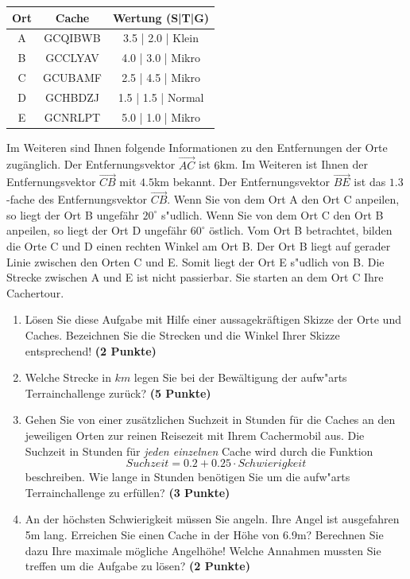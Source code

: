 \documentclass[a4paper, 9pt]{scrartcl}\usepackage[]{graphicx}\usepackage[]{xcolor}
\begin{document}
\begin{center}
  \begin{tabular}{ ccc }
    \toprule
    Ort & Cache & Wertung (S|T|G) \\
    \midrule
    A & GCQIBWB & 3.5 | 2.0 | Klein \\
    B & GCCLYAV & 4.0 | 3.0 | Mikro \\ 
    C & GCUBAMF & 2.5 | 4.5 | Mikro \\ 
    D & GCHBDZJ & 1.5 | 1.5 | Normal \\ 
    E & GCNRLPT & 5.0 | 1.0 | Mikro \\     
 \bottomrule
\end{tabular}
\end{center}

Im Weiteren sind Ihnen folgende Informationen zu den Entfernungen der Orte
zug{\"a}nglich. Der Entfernungsvektor $\overrightarrow{AC}$ ist
$6$km. Im Weiteren ist Ihnen der Entfernungsvektor
$\overrightarrow{CB}$ mit $4.5$km bekannt. Der
Entfernungsvektor $\overrightarrow{BE}$ ist das $1.3$-fache
des Entfernungsvektor $\overrightarrow{CB}$. Wenn Sie von dem Ort A den Ort
C anpeilen, so liegt der Ort B ungef{\"a}hr $20^\circ$
s{"u}dlich. Wenn Sie von dem Ort C den Ort B anpeilen, so liegt
der Ort D ungef{\"a}hr $60^\circ$ {\"o}stlich. Vom Ort B
betrachtet, bilden die Orte C und D einen rechten Winkel am Ort B. Der Ort
B liegt auf gerader Linie zwischen den Orten C und E. Somit liegt der Ort E
s{"u}dlich von B. Die Strecke zwischen A und E ist nicht
passierbar. Sie starten an dem Ort C Ihre Cachertour. \\

\begin{enumerate}
\item L{\"o}sen Sie diese Aufgabe mit Hilfe einer aussagekr{\"a}ftigen Skizze der
  Orte und Caches. Bezeichnen Sie die Strecken und die Winkel Ihrer Skizze
  entsprechend! \textbf{(2 Punkte)}
\item Welche Strecke in $km$ legen Sie bei der Bew{\"a}ltigung der
  aufw{"a}rts Terrainchallenge zur{\"u}ck? \textbf{(5
    Punkte)}
\item Gehen Sie von einer zus{\"a}tzlichen Suchzeit in Stunden f{\"u}r die
  Caches an den jeweiligen Orten zur reinen Reisezeit mit Ihrem Cachermobil
  aus. Die Suchzeit in Stunden f{\"u}r \textit{jeden einzelnen} Cache wird durch die
  Funktion
  \begin{equation*}
    Suchzeit = 0.2 + 0.25 \cdot Schwierigkeit
  \end{equation*}  
  beschreiben.  Wie lange in Stunden ben{\"o}tigen Sie um die
  aufw{"a}rts Terrainchallenge zu erf{\"u}llen? \textbf{(3 Punkte)}
\item An der h{\"o}chsten Schwierigkeit m{\"u}ssen Sie angeln. Ihre Angel ist
  ausgefahren 5m lang. Erreichen Sie einen Cache in der H{\"o}he
  von 6.9m?  Berechnen Sie dazu Ihre maximale m{\"o}gliche
  Angelh{\"o}he! Welche Annahmen mussten Sie treffen um die Aufgabe zu l{\"o}sen? \textbf{(2 Punkte)} 
\end{enumerate}
\end{document}
